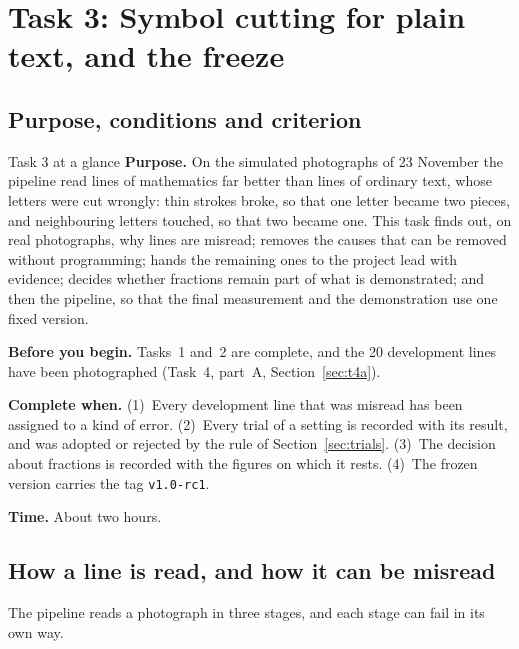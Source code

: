 \section{Task 3: Symbol cutting for plain text, and the freeze}
\label{sec:t3}

\subsection{Purpose, conditions and criterion}

\begin{plain}{Task 3 at a glance}
\textbf{Purpose.} On the simulated photographs of 23 November the pipeline read lines of
mathematics far better than lines of ordinary text, whose letters were cut wrongly: thin
strokes broke, so that one letter became two pieces, and neighbouring letters touched, so that
two became one. This task finds out, on real photographs, why lines are misread; removes the
causes that can be removed without programming; hands the remaining ones to the project lead
with evidence; decides whether fractions remain part of what is demonstrated; and then
 the pipeline, so that the final measurement and the demonstration use one fixed
version.

\textbf{Before you begin.} Tasks~1 and~2 are complete, and the 20 development lines have been
photographed (Task~4, part~A, Section~\ref{sec:t4a}).

\textbf{Complete when.} (1)~Every development line that was misread has been assigned to a
kind of error. (2)~Every trial of a setting is recorded with its result, and was adopted or
rejected by the rule of Section~\ref{sec:trials}. (3)~The decision about fractions is recorded
with the figures on which it rests. (4)~The frozen version carries the tag \texttt{v1.0-rc1}.

\textbf{Time.} About two hours.
\end{plain}

\subsection{How a line is read, and how it can be misread}
\label{sec:kinds}

The pipeline reads a photograph in three stages, and each stage can fail in its own way.

